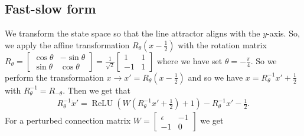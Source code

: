 \documentclass{article} %
\newcounter{ct}
\theoremstyle{definition}
\theoremstyle{remark}
\begin{document}
\subsection{Fast-slow form}

We transform the state space so that the line attractor aligns with the $y$-axis.
So, we apply the affine transformation $R_\theta(x-\frac{1}{2})$ with the rotation matrix $R_\theta = \begin{bmatrix}\cos\theta &-\sin\theta\\\sin\theta&\cos\theta\end{bmatrix}= \frac{1}{\sqrt{2}}\begin{bmatrix}1 &1\\-1&1\end{bmatrix}$ where we have set $\theta=-\frac{\pi}{4}$.
So we perform the transformation $x\rightarrow x'= R_\theta(x-\frac{1}{2})$ and so we have $x=R^{-1}_\theta x'+\frac{1}{2}$ with $R^{-1}_\theta = R_{-\theta}$.
Then we get that 
\begin{align}
R_{\theta}^{-1}\dot x' = \operatorname{ReLU}\left(W(R^{-1}_\theta x'+\frac{1}{2})+1\right)-R^{-1}_\theta x'-\frac{1}{2}.
\end{align}
For a perturbed connection matrix $W=\begin{bmatrix}\epsilon &-1\\-1&0\end{bmatrix}$ we get 
\end{document}
